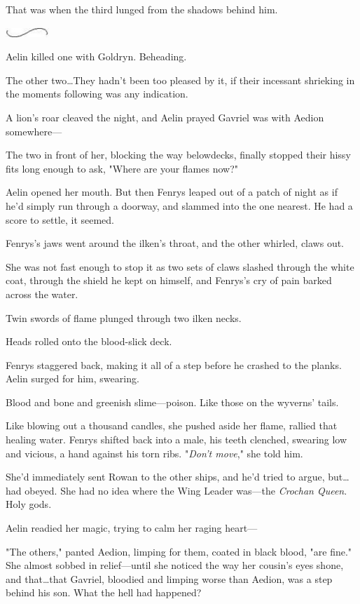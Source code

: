 That was when the third lunged from the shadows behind him.

\begin{center}
	\includegraphics[width=0.65in,height=0.13in]{images/seperator}
\end{center}

Aelin killed one with Goldryn.
Beheading.

The other two\ldots They hadn't been too pleased by it, if their incessant shrieking in the moments following was any indication.

A lion's roar cleaved the night, and Aelin prayed Gavriel was with Aedion somewhere---

The two in front of her, blocking the way belowdecks, finally stopped their hissy fits long enough to ask, "Where are your flames now?"

Aelin opened her mouth.
But then Fenrys leaped out of a patch of night as if he'd simply run through a doorway, and slammed into the one nearest.
He had a score to settle, it seemed.

Fenrys's jaws went around the ilken's throat, and the other whirled, claws out.

She was not fast enough to stop it as two sets of claws slashed through the white coat, through the shield he kept on himself, and Fenrys's cry of pain barked across the water.

Twin swords of flame plunged through two ilken necks.

Heads rolled onto the blood-slick deck.

Fenrys staggered back, making it all of a step before he crashed to the planks.
Aelin surged for him, swearing.

Blood and bone and greenish slime---poison.
Like those on the wyverns' tails.

Like blowing out a thousand candles, she pushed aside her flame, rallied that healing water.
Fenrys shifted back into a male, his teeth clenched, swearing low and vicious, a hand against his torn ribs.
"\emph{Don't move}," she told him.

She'd immediately sent Rowan to the other ships, and he'd tried to argue, but\ldots had obeyed.
She had no idea where the Wing Leader was---the \emph{Crochan Queen}.
Holy gods.

Aelin readied her magic, trying to calm her raging heart---

"The others," panted Aedion, limping for them, coated in black blood, "are fine."
She almost sobbed in relief---until she noticed the way her cousin's eyes shone, and that\ldots that Gavriel, bloodied and limping worse than Aedion, was a step behind his son.
What the hell had happened?

